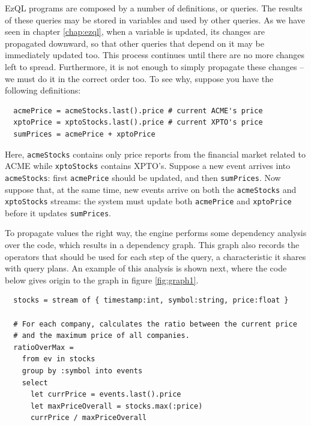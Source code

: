 EzQL programs are composed by a number of definitions, or queries. The
results of these queries may be stored in variables and used by other
queries. As we have seen in chapter \ref{chap:ezql}, when a variable
is updated, its changes are propagated downward, so that other queries
that depend on it may be immediately updated too. This process
continues until there are no more changes left to spread. Furthermore,
it is not enough to simply propagate these changes -- we must do it in
the correct order too. To see why, suppose you have the following
definitions:

\begin{lstlisting}
  acmePrice = acmeStocks.last().price # current ACME's price
  xptoPrice = xptoStocks.last().price # current XPTO's price
  sumPrices = acmePrice + xptoPrice
\end{lstlisting}

Here, \verb=acmeStocks= contains only price reports from the financial
market related to ACME while \verb=xptoStocks= contains
XPTO's. Suppose a new event arrives into \verb=acmeStocks=: first
\verb=acmePrice= should be updated, and then \verb=sumPrices=. Now
suppose that, at the same time, new events arrive on both the
\verb=acmeStocks= and \verb=xptoStocks= streams: the system must
update both \verb=acmePrice= and \verb=xptoPrice= before it updates
\verb=sumPrices=.

To propagate values the right way, the engine performs some dependency
analysis over the code, which results in a dependency graph. This
graph also records the operators that should be used for each step of
the query, a characteristic it shares with query plans. An example of
this analysis is shown next, where the code below gives origin to the
graph in figure \ref{fig:graph1}.

\begin{lstlisting}
  stocks = stream of { timestamp:int, symbol:string, price:float }

  # For each company, calculates the ratio between the current price
  # and the maximum price of all companies.
  ratioOverMax =
    from ev in stocks
    group by :symbol into events
    select
      let currPrice = events.last().price
      let maxPriceOverall = stocks.max(:price)
      currPrice / maxPriceOverall
\end{lstlisting}

